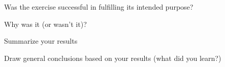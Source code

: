 \documentclass{article}
\begin{document}
	Was the exercise successful in fulfilling its intended purpose?
	
	Why was it (or wasn't it)?
	
	Summarize your results
	
	Draw general conclusions based on your results (what did you learn?)
	
	
	
	
	
	
	
	
	
	
	
	\newpage
	
	
	
	
	
	
\end{document}
